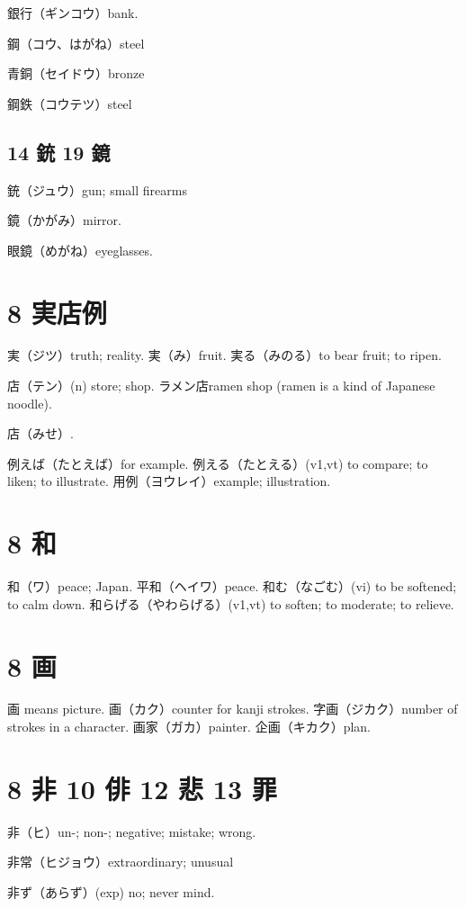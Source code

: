 銀行（ギンコウ）bank.

鋼（コウ、はがね）steel

青銅（セイドウ）bronze

鋼鉄（コウテツ）steel

\subsection{14 銃 19 鏡}

銃（ジュウ）gun; small firearms

鏡（かがみ）mirror.

眼鏡（めがね）eyeglasses.

\section{8 実店例}

実（ジツ）truth; reality.
実（み）fruit.
実る（みのる）to bear fruit; to ripen.

店（テン）(n) store; shop.
ラメン店ramen shop (ramen is a kind of Japanese noodle).

店（みせ）.

例えば（たとえば）for example.
例える（たとえる）(v1,vt)
to compare; to liken; to illustrate.
用例（ヨウレイ）example; illustration.

\section{8 和}

和（ワ）peace; Japan.
平和（ヘイワ）peace.
和む（なごむ）(vi) to be softened; to calm down.
和らげる（やわらげる）(v1,vt) to soften; to moderate; to relieve.

\section{8 画}

画 means picture.
画（カク）counter for kanji strokes.
字画（ジカク）number of strokes in a character.
画家（ガカ）painter.
企画（キカク）plan.

\section{8 非 10 俳 12 悲 13 罪}

非（ヒ）un-; non-; negative; mistake; wrong.

非常（ヒジョウ）extraordinary; unusual

非ず（あらず）(exp) no; never mind.


